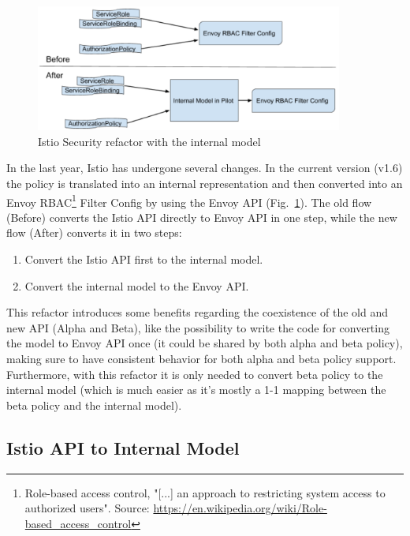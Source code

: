 \begin{figure}
    \centering
    \includegraphics[width=0.9\textwidth]{chapters/images/chp3/before-after.png}
    \caption{Istio Security refactor with the internal model}
    \label{fig:int-rep}
\end{figure}


In the last year, Istio has undergone several changes. In the current version (v1.6) the policy is translated into an internal representation and then converted into an Envoy RBAC\footnote{Role-based access control, "[...] an approach to restricting system access to authorized users". Source: \url{https://en.wikipedia.org/wiki/Role-based_access_control}} Filter Config by using the Envoy API (Fig.~\ref{fig:int-rep}).
The old flow (Before) converts the Istio API directly to Envoy API in one step, while the new flow (After) converts it in two steps: 
\begin{enumerate}
    \item Convert the Istio API first to the internal model.
    \item Convert the internal model to the Envoy API.
\end{enumerate}

This refactor introduces some benefits regarding the coexistence of the old and new API (Alpha and Beta), like the possibility to write the code for converting the model to Envoy API once (it could be shared by both alpha and beta policy), making sure to have consistent behavior for both alpha and beta policy support. Furthermore, with this refactor it is only needed to convert beta policy to the internal model (which is much easier as it’s mostly a 1-1 mapping between the beta policy and the internal model).

\subsection{Istio API to Internal Model}


